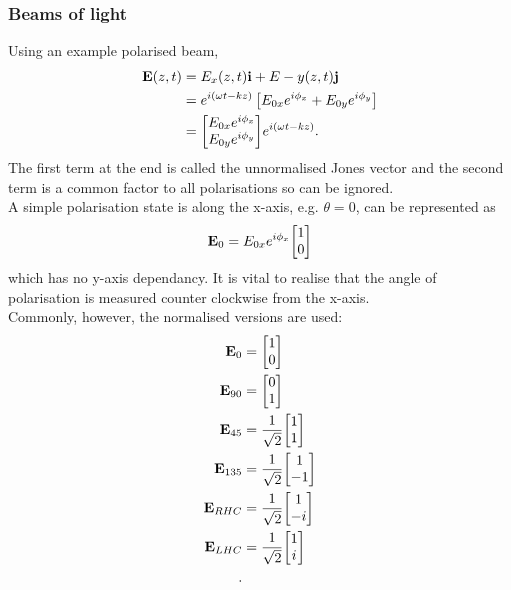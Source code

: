 \subsubsection{Beams of light}
Using an example polarised beam,
\begin{align*}
\vb{E}(z,t) &= E_x(z,t)\vb{i} + E-y(z,t)\vb{j}\\
		&= e^{i(\omega{t} - kz)}\left[E_{0x}e^{i\phi_x} + E_{0y}e^{i\phi_y}\right]\\
		&= \mqty[E_{0x}e^{i\phi_x} \\ E_{0y}e^{i\phi_y}]e^{i(\omega{t} -kz)} .
\end{align*}
The first term at the end is called the unnormalised Jones vector and the second term is a common factor to all polarisations so can be ignored.
\\
A simple polarisation state is along the x-axis, e.g. \(\theta = 0\), can be represented as 
\[\vb{E}_0 = E_{0x}e^{i\phi_x}\mqty[1 \\ 0]\]
which has no y-axis dependancy.
It is vital to realise that the angle of polarisation is measured counter clockwise from the x-axis.
\\
Commonly, however, the normalised versions are used:
\begin{align*}
\vb{E}_0 &= \mqty[1 \\ 0]\\
\vb{E}_{90} &= \mqty[0 \\ 1]\\
\vb{E}_{45} &= \frac{1}{\sqrt{2}}\mqty[1 \\ 1]\\
\vb{E}_{135} &= \frac{1}{\sqrt{2}}\mqty[1 \\ -1]\\
\vb{E}_{RHC} &= \frac{1}{\sqrt{2}}\mqty[1 \\ -i]\\
\vb{E}_{LHC} &= \frac{1}{\sqrt{2}}\mqty[1 \\ i]\\.
\end{align*}
